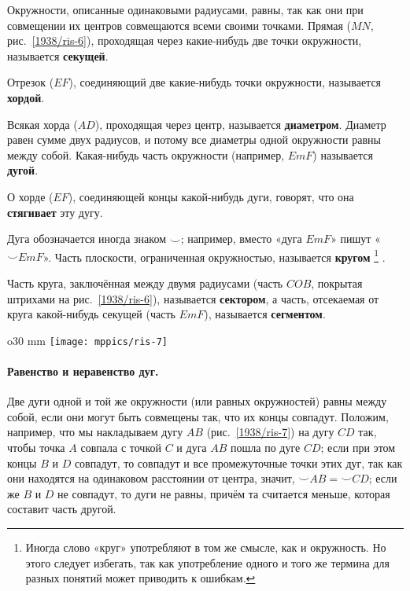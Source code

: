 Окружности, описанные одинаковыми радиусами, равны, так как они при совмещении их центров совмещаются всеми своими точками.
Прямая ($MN$, рис.~\ref{1938/ris-6}), проходящая через какие-нибудь две точки окружности, называется \textbf{секущей}.

Отрезок ($EF$), соединяющий две какие-нибудь точки окружности, называется \textbf{хордой}.

Всякая хорда ($AD$), проходящая через центр, называется \textbf{диаметром}.
Диаметр равен сумме двух радиусов, и потому все диаметры одной окружности равны между собой.
Какая-нибудь часть окружности (например, $EmF$) называется \textbf{дугой}.

О хорде ($EF$), соединяющей концы какой-нибудь дуги, говорят, что она \textbf{стягивает} эту дугу.

Дуга обозначается иногда знаком $\smallsmile$;
например, вместо «дуга $EmF$» пишут «${\smallsmile} EmF$».
Часть плоскости, ограниченная окружностью, называется \textbf{кругом}%
\footnote{Иногда слово «круг» употребляют в том же смысле, как и окружность.
Но этого следует избегать, так как употребление одного и того же термина для разных понятий может приводить к ошибкам.}%
.

Часть круга, заключённая между двумя радиусами (часть $COB$, покрытая штрихами на рис.~\ref{1938/ris-6}), называется \textbf{сектором}, а часть, отсекаемая от круга какой-нибудь секущей (часть $EmF$), называется \textbf{сегментом}.

\begin{wrapfigure}{o}{30 mm}
\vskip-2mm
\centering
\texttt{[image: mppics/ris-7]}
\caption{}\label{1938/ris-7}
\end{wrapfigure}

\paragraph{Равенство и неравенство дуг.}\label{1938/10}
Две дуги одной и той же окружности (или равных окружностей) равны между собой, если они могут быть совмещены так, что их концы совпадут.
Положим, например, что мы накладываем дугу $AB$ (рис.~\ref{1938/ris-7}) на дугу $CD$ так, чтобы точка $A$ совпала с точкой $C$ и дуга $AB$ пошла по дуге $CD$;
если при этом концы $B$ и $D$ совпадут, то совпадут и все промежуточные точки этих дуг, так как они находятся на одинаковом расстоянии от центра, значит, ${\smallsmile} AB={\smallsmile} CD$;
если же $B$ и $D$ не совпадут, то дуги не равны, причём та считается меньше, которая составит часть другой.

